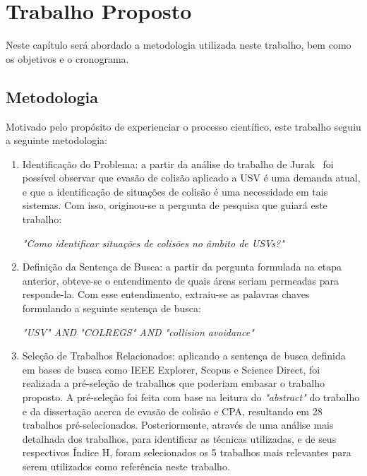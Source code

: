 \chapter{Trabalho Proposto}

    Neste capítulo será abordado a metodologia utilizada neste trabalho, bem como os objetivos e o cronograma.

    \section{Metodologia}
        Motivado pelo propósito de experienciar o processo científico, este trabalho seguiu a seguinte metodologia: 
        
        \begin{enumerate}[label=\alph*)]
            \item Identificação do Problema: a partir da análise do trabalho de Jurak~\cite{JURAK2020} foi possível observar que evasão de colisão aplicado a USV é uma demanda atual, e que a identificação de situações de colisão é uma necessidade em tais sistemas. Com isso, originou-se a pergunta de pesquisa que guiará este trabalho:
            
            \vspace{3mm}
            
            \centerline{\textit{"Como identificar situações de colisões no âmbito de USVs?"}}
            
            \item Definição da Sentença de Busca: a partir da pergunta formulada na etapa anterior, obteve-se o entendimento de quais áreas seriam permeadas para responde-la. Com esse entendimento, extraiu-se as palavras chaves formulando a seguinte sentença de busca:
            
            \vspace{3mm}
            
            \centerline{\textit{"USV" AND "COLREGS" AND "collision avoidance"}}
            
            \item Seleção de Trabalhos Relacionados: aplicando a sentença de busca definida em bases de busca como IEEE Explorer, Scopus e Science Direct, foi realizada a pré-seleção de trabalhos que poderiam embasar o trabalho proposto. A pré-seleção foi feita com base na leitura do \textit{"abstract"} do trabalho e da dissertação acerca de evasão de colisão e CPA, resultando em 28 trabalhos pré-selecionados. Posteriormente, através de uma análise mais detalhada dos trabalhos, para identificar as técnicas utilizadas, e de seus respectivos Índice H, foram selecionados os 5 trabalhos mais relevantes para serem utilizados como referência neste trabalho.
            

\end{enumerate}
